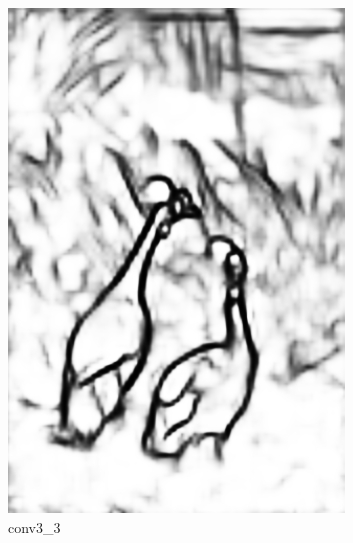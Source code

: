 \documentclass[a4paper]{ctexart}
\begin{document}
\begin{figure}[htb]
\begin{subfigure}{0.2\textwidth}
			\includegraphics[width=\linewidth]{picture/LLIE/RCF/conv3_3}
			\captionsetup{font=scriptsize}
			\caption{conv3\_3}
			\label{fig: conv3_3}
		\end{subfigure}
		\begin{subfigure}{0.2\textwidth}

\end{subfigure}
\end{figure}
\end{document}
